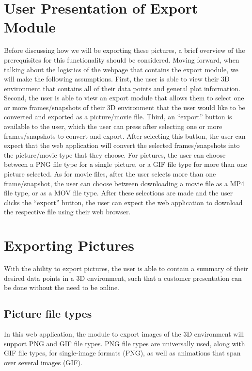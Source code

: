 \documentclass[letterpaper,10pt,titlepage, onecolumn, draftclsnofoot]{IEEEtran}
\begin{document}
\section{User Presentation of Export Module}
Before discussing how we will be exporting these pictures, a brief overview of the prerequisites for this functionality should be considered. Moving forward, when talking about the logistics of the webpage that contains the export module, we will make the following assumptions. \newline
\indent First, the user is able to view their 3D environment that contains all of their data points and general plot information. Second, the user is able to view an export module that allows them to select one or more frames/snapshots of their 3D environment that the user would like to be converted and exported as a picture/movie file. Third, an “export” button is available to the user, which the user can press after selecting one or more frames/snapshots to convert and export. After selecting this button, the user can expect that the web application will convert the selected frames/snapshots into the picture/movie type that they choose. \newline
\indent For pictures, the user can choose between a PNG file type for a single picture, or a GIF file type for more than one picture selected. As for movie files, after the user selects more than one frame/snapshot, the user can choose between downloading a movie file as a MP4 file type, or as a MOV file type. After these selections are made and the user clicks the “export” button, the user can expect the web application to download the respective file using their web browser. \newline

\section{Exporting Pictures}
With the ability to export pictures, the user is able to contain a summary of their desired data points in a 3D environment, such that a customer presentation can be done without the need to be online.

\subsection{Picture file types}
In this web application, the module to export images of the 3D environment will support PNG and GIF file types. PNG file types are universally used, along with GIF file types, for single-image formats (PNG), as well as animations that span over several images (GIF).	
\end{document}
